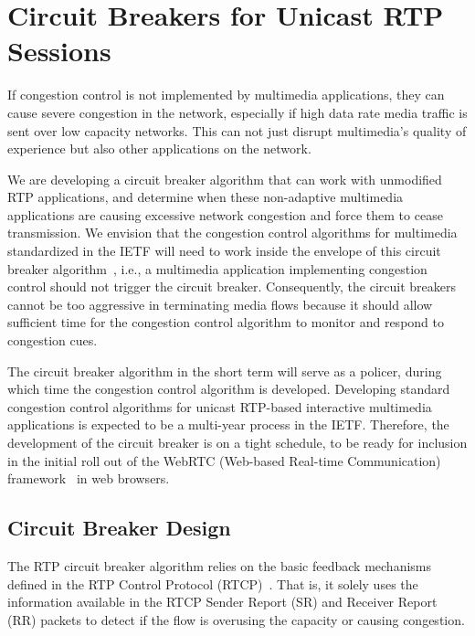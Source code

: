 

\section{Circuit Breakers for Unicast RTP Sessions}

If congestion control is not implemented by multimedia applications, they can
cause severe congestion in the network, especially if high data rate media
traffic is sent over low capacity networks. This can not just disrupt
multimedia's quality of experience but also other applications on the network.

We are developing a circuit breaker algorithm that can work with unmodified
RTP applications, and determine when these non-adaptive multimedia
applications are causing excessive network congestion and force them to cease
transmission.  We envision that the congestion control algorithms for
multimedia standardized in the IETF will need to work inside the envelope of
this circuit breaker algorithm~\cite{draft.rmcat.evaluate}, i.e., a multimedia
application implementing congestion control should not trigger the circuit
breaker. Consequently, the circuit breakers cannot be too aggressive in
terminating media flows because it should allow sufficient time for the
congestion control algorithm to monitor and respond to congestion cues.

The circuit breaker algorithm in the short term will serve as a policer,
during which time the congestion control algorithm is developed. Developing
standard congestion control algorithms for unicast RTP-based interactive
multimedia applications is expected to be a multi-year process in the IETF.
Therefore, the development of the circuit breaker is on a tight schedule, to
be ready for inclusion in the initial roll out of the WebRTC (Web-based 
Real-time Communication) framework~\cite{jennings:2013:webrtc} in web browsers.

\subsection{Circuit Breaker Design}
\label{fw.cb.design}

The RTP circuit breaker algorithm relies on the basic feedback mechanisms
defined in the RTP Control Protocol (RTCP)~\cite{rfc3550}. That is, it solely
uses the information available in the RTCP Sender Report (SR) and Receiver
Report (RR) packets to detect if the flow is overusing the capacity or causing
congestion.

